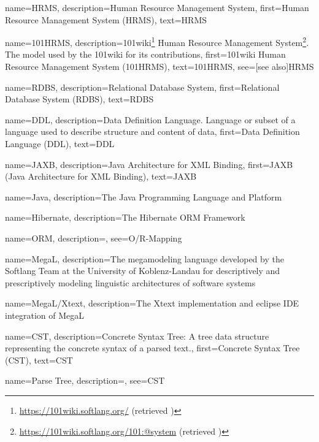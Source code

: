 {
    name=HRMS,
    description={Human Resource Management System},
    first={Human Resource Management System (HRMS)},
    text={HRMS}
}

{
    name=101HRMS,
    description={101wiki\footnote{\url{https://101wiki.softlang.org/} (retrieved )} Human Resource Management System\footnote{\url{https://101wiki.softlang.org/101:@system} (retrieved )}. The model used by the 101wiki for its contributions},
    first={101wiki Human Resource Management System (101HRMS)},
    text={101HRMS},
    see=[see also]{HRMS}
}

{
    name=RDBS,
    description={Relational Database System},
    first={Relational Database System (RDBS)},
    text={RDBS}
}

{
    name=DDL,
    description={Data Definition Language. Language or subset of a language used to describe structure and content of data},
    first={Data Definition Language (DDL)},
    text={DDL}
}

{
    name=JAXB,
    description={Java Architecture for XML Binding},
    first={JAXB (Java Architecture for XML Binding)},
    text={JAXB}
}

{
    name=Java,
    description={The Java Programming Language and Platform}
}

{
    name=Hibernate,
    description={The Hibernate \gls{ORM} Framework}
}

{
    name=ORM,
    description={},
    see={O/R-Mapping}
}

{
    name=MegaL,
    description={The megamodeling language developed by the Softlang Team at the University of Koblenz-Landau for descriptively and prescriptively modeling linguistic architectures of software systems}
}

{
    name=MegaL/\-X\-text,
    description={The Xtext implementation and eclipse IDE integration of \gls{MegaL}}
}

{
    name=CST,
    description={Concrete Syntax Tree: A tree data structure representing the concrete syntax of a parsed text.},
    first={Concrete Syntax Tree (CST)},
    text={CST}
}

{
    name={Parse Tree},
    description={},
    see={CST}
}

